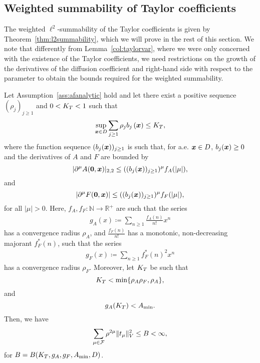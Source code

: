 \subsection{Weighted summability of Taylor coefficients}
\label{sec:weightedl2}
The weighted $\ell^2$-summability of the Taylor coefficients is given by Theorem~\ref{thm:l2summability}, which we will prove in the rest of this section.
We note that differently from Lemma~\ref{col:taylorvar}, where we were only concerned with the existence of the Taylor coefficients, we need restrictions on the growth of the derivatives of the diffusion coefficient and right-hand side with respect to the parameter to obtain the bounds required for the weighted summability.
\begin{theorem}\label{thm:l2summability}
Let Assumption~\ref{ass:afanalytic} hold and let there exist a positive sequence $(\rho_j)_{j\geq 1}$ and $0<K_T<1$ such that
\begin{equation}
	\sup_{{{\bm{x}}}\in D}\sum_{j \geq 1} \rho_j b_j\left({{\bm{x}}} \right) \leq K_T,  \label{eq:Kbassumption}
\end{equation}
where the function sequence $(b_j({{\bm{x}}}))_{j \geq 1}$ is such that, for a.e. ${{\bm{x}}}\in D$, $b_j({{\bm{x}}})\geq 0$  and the derivatives of $A$ and $F$ are bounded by
\begin{equation*}
	|\partial^\mu A(\bm{0},{{\bm{x}}})|_{2,2} \leq ((b_j({{\bm{x}}}))_{j \geq 1})^\mu f_A(|\mu|),
\end{equation*}
and
\begin{equation}
	\left|\partial^\mu F(\bm{0},{{\bm{x}}})\right| \leq ((b_j({{\bm{x}}}))_{j \geq 1})^\mu f_F(|\mu|),\label{eq:AFder}
\end{equation}
for all $|\mu| > 0$.
Here, $f_A,f_F:\mathbb{N} \to \mathbb{R}^+$ are such that the series
\begin{align}
	g_A(x)\coloneqq\sum_{n \geq 1} \frac{f_A(n)}{n!}x^n \label{eq:gAdef}
\end{align}
has a convergence radius $\rho_A$, and $\frac{f_F(n)}{n!}$ has a monotonic, non-decreasing majorant $f^*_F(n)$, such that the series
\begin{align}
	g_F(x)\coloneqq\sum_{n \geq 1} f^*_F(n)^2x^n \label{eq:gFdef}
\end{align}
has a convergence radius $\rho_F$.
Moreover, let $K_T$ be such that
\begin{equation}
	K_T < \min\{\rho_A\rho_F, \rho_A\}, \label{eq:rhoArhoFass}
\end{equation}
and
\begin{equation}
	g_A(K_T)  < A_{\min}. \label{eq:assKbKc}
\end{equation}
Then, we have
\begin{equation}
	\sum_{\mu \in \mathcal{F}} \rho^{2\mu} \|t_\mu\|_{{V}}^2 \leq B < \infty, \label{eq:weightedsumresult}
\end{equation}
for $B=B(K_T, g_A, g_F, A_{\min}, D)$. %
\end{theorem}


